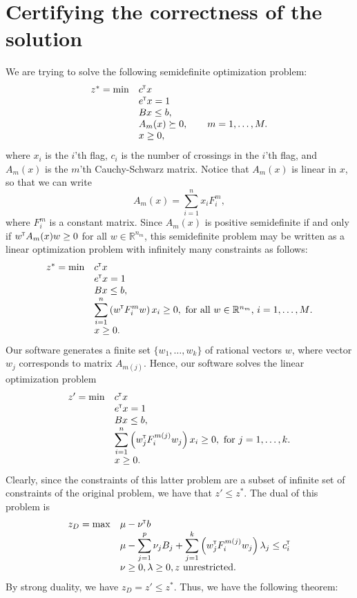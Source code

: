 \documentclass{article}
\def\dR{\mathbb{R}}
\def\T{{\mbox{\hspace{-.05em}\scalebox{0.66}{\footnotesize\sffamily T}}}}
\begin{document}
\section{Certifying the correctness of the solution\label{certification}}
We are trying to solve the following semidefinite optimization problem:
\[
\begin{array}{ll}
z^* = \min & c^\T x \\
& e^\T x = 1 \\
& Bx \leq b, \\
& A_m(x) \succeq 0, \qquad m=1,\hdots, M.\\
& x \geq 0,
\end{array}
\]
where $x_i$ is the $i$'th flag, $c_i$ is the number of crossings in the $i$'th flag, and $A_m(x)$ is the $m$'th Cauchy-Schwarz matrix. Notice that $A_m(x)$ is linear in $x$, so that we can write
\[
A_m(x) = \sum_{i=1}^n x_i F^{m}_i,
\]
where $F^m_i$ is a constant matrix.
Since $A_m(x)$ is positive semidefinite if and only if $w^\T A_m(x)w\geq 0$ for
all $w\in \dR^{n_m}$, this semidefinite problem may be written 
as a linear optimization problem with infinitely many constraints as follows:
\[
\begin{array}{ll}
z^* = \min & c^\T x \\
& e^\T x = 1 \\
& Bx \leq b, \\
& \displaystyle
\sum_{i=1}^n \left(w^\T F^{m}_iw\right)x_i \geq 0, \mbox{ for all $w\in \dR^{n_m}$, $i=1,\hdots, M$.}\\
& x \geq 0.
\end{array}
\]
Our software generates a finite set $\{w_1, \hdots, w_k\}$ of rational vectors $w$, where vector
$w_j$ corresponds to matrix $A_{m(j)}$. 
Hence, our software solves the linear optimization problem
\[
\begin{array}{ll}
z' = \min & c^\T x \\
& e^\T x = 1 \\
& Bx \leq b, \\
& \displaystyle
\sum_{i=1}^n \left(w_j^\T F^{m(j)}_iw_j\right)x_i \geq 0, \mbox{ for $j =1, \hdots, k$.}\\
& x \geq 0.
\end{array}
\]
Clearly, since the constraints of this latter problem are a subset of infinite set of constraints 
of the original problem, we have that $z' \leq z^*$.  The dual of this problem is
\[
\begin{array}{ll}
z_D = \max & \mu - \nu^\T b\\
& \displaystyle
\mu - \sum_{j=1}^p \nu_j B_j +
 \sum_{j=1}^k \left(w_j^\T F^{m(j)}_i w_j\right) \lambda_j   \leq c^\T_i \\
& \nu \geq 0, \lambda \geq 0, z\mbox{ unrestricted}.
\end{array}
\]
By strong duality, we have $z_D = z' \leq z^*$.
Thus, we have the following theorem:
\end{document}
